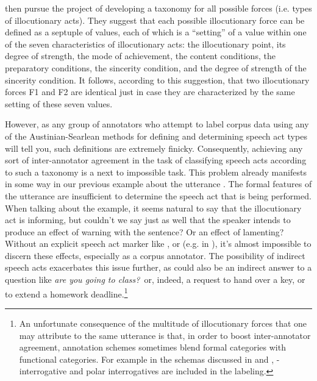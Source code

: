 \textcite{searlevanderveken1985} then pursue the project of developing a taxonomy for all possible forces (i.e. types of illocutionary acts). They suggest that each possible illocutionary force can be defined as a septuple of values, each of which is a ``setting'' of a value within one of the seven characteristics of illocutionary acts: the illocutionary point, its degree of strength, the mode of achievement, the content conditions, the preparatory conditions, the sincerity condition, and the degree of strength of the sincerity condition. It follows, according to this suggestion, that two illocutionary forces F1 and F2 are identical just in case they are characterized by the same setting of these seven values.

However, as any group of annotators who attempt to label corpus data using any of the Austinian-Searlean methods for defining and determining speech act types will tell you, such definitions are extremely finicky. Consequently, achieving any sort of inter-annotator agreement in the task of classifying speech acts according to such a taxonomy is a next to impossible task. This problem already manifests in some way in our previous example about the utterance . The formal features of the utterance are insufficient to determine the speech act that is being performed. When talking about the example, it seems natural to say that the illocutionary act is informing, but couldn’t we say just as well that the speaker intends to produce an effect of warning with the sentence? Or an effect of lamenting? Without an explicit speech act marker like ,  or  (e.g. in ), it’s almost impossible to discern these effects, especially as a corpus annotator. The possibility of indirect speech acts exacerbates this issue further, as  could also be an indirect answer to a question like \emph{are you going to class?}\ or, indeed, a request to hand over a key, or to extend a homework deadline.\footnote{An unfortunate consequence of the multitude of illocutionary forces that one may attribute to the same utterance is that, in order to boost inter-annotator agreement, annotation schemes sometimes blend formal categories with functional categories. For example in the schemas discussed in \textcite{ninio1994} and \textcite{dialogact}, \twh-interrogative and polar interrogatives are included in the labeling.}

